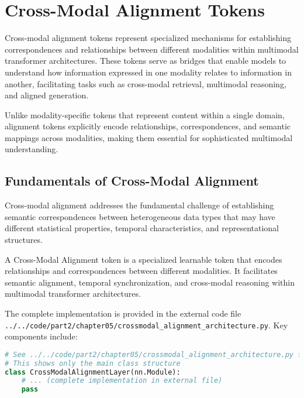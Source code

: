 
\section{Cross-Modal Alignment Tokens}

Cross-modal alignment tokens represent specialized mechanisms for establishing correspondences and relationships between different modalities within multimodal transformer architectures. These tokens serve as bridges that enable models to understand how information expressed in one modality relates to information in another, facilitating tasks such as cross-modal retrieval, multimodal reasoning, and aligned generation.

Unlike modality-specific tokens that represent content within a single domain, alignment tokens explicitly encode relationships, correspondences, and semantic mappings across modalities, making them essential for sophisticated multimodal understanding.

\subsection{Fundamentals of Cross-Modal Alignment}

Cross-modal alignment addresses the fundamental challenge of establishing semantic correspondences between heterogeneous data types that may have different statistical properties, temporal characteristics, and representational structures.

\begin{definition}
A Cross-Modal Alignment token is a specialized learnable token that encodes relationships and correspondences between different modalities. It facilitates semantic alignment, temporal synchronization, and cross-modal reasoning within multimodal transformer architectures.
\end{definition}

The complete implementation is provided in the external code file \texttt{../../code/part2/chapter05/crossmodal\_alignment\_architecture.py}. Key components include:

\begin{lstlisting}[language=Python, caption=Core structure (see external file for complete implementation)]
# See ../../code/part2/chapter05/crossmodal_alignment_architecture.py for the complete implementation
# This shows only the main class structure
class CrossModalAlignmentLayer(nn.Module):
    # ... (complete implementation in external file)
    pass
\end{lstlisting}
